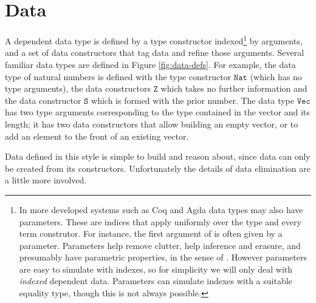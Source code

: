 \section{Data}


A dependent data type is defined by a type constructor indexed\footnote{
 In more developed systems such as Coq and Agda data types may also have parameters.
 These are indices that apply uniformly over the type and every term construtor.
 For instance, the first argument of \Vect{} is often given by a parameter.
 Parameters help remove clutter, help inference and erasure, and presumably have parametric properties, in the sense of \cite{10.1145/99370.99404}.
 However parameters are easy to simulate with indexes, so for simplicity we will only deal with \emph{indexed} dependent data.
 Parameters can simulate indexes with a suitable equality type\cite{sjoberg2012irrelevance}, though this is not always possible\cite[Section 8]{bertrand:hal-02896776}.
} by arguments, and a set of data constructors that tag data and refine those arguments.
Several familiar data types are defined in Figure \ref{fig:data-defs}.
For example, the data type of natural numbers is defined with the type constructor $\mathtt{Nat}$ (which has no type arguments), the data constructors $\mathtt{Z}$ which takes no further information and the data constructor $\mathtt{S}$ which is formed with the prior number.
The data type $\mathtt{Vec}$ has two type arguments corresponding to the type contained in the vector and its length; it has two data constructors that allow building an empty vector, or to add an element to the front of an existing vector.

Data defined in this style is simple to build and reason about, since data can only be created from its constructors.
Unfortunately the details of data elimination are a little more involved.

